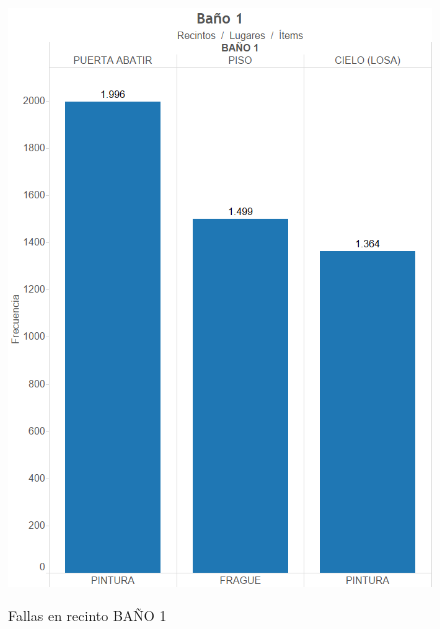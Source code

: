 \documentclass[letter,12pt,oneside]{report}
\begin{document}
\begin{figure}[H]
\begin{center}
\includegraphics[scale=0.5]{images/bano1.png}
\caption{Fallas en recinto BAÑO 1}
\label{}
\end{center}
\end{figure}
\end{document}
